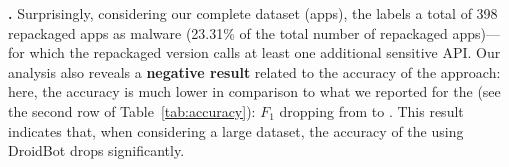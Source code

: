 \begin{table}[htb]
  \caption{Accuracy of the \mas in both datasets.}
  \label{tab:accuracy}
\end{table}








{\bf \cds.} Surprisingly, considering our complete dataset (\apps apps), the \mas
labels a total of 398 repackaged apps as malware (23.31\% of the total number of repackaged
apps)---for which the repackaged version calls at least one additional sensitive API.
Our analysis also reveals a {\bf negative result} related to the accuracy of the approach: here,
the accuracy is much lower in comparison to what we reported for the
\sds (see the second row of Table~\ref{tab:accuracy}): $F_1$ dropping from \fscoreSmall to \fscore.
This result indicates that, when considering a large dataset, the accuracy of the \mas using
DroidBot drops significantly. 

